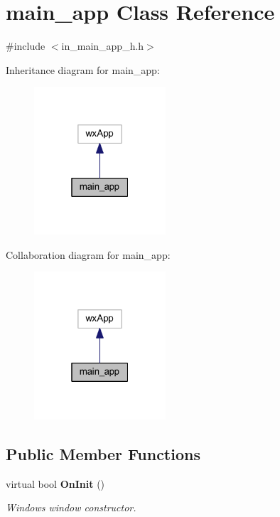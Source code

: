 \section{main\+\_\+app Class Reference}
\label{classmain__app}


{\ttfamily \#include $<$in\+\_\+main\+\_\+app\+\_\+h.\+h$>$}



Inheritance diagram for main\+\_\+app\+:\nopagebreak
\begin{figure}[H]
\begin{center}
\leavevmode
\includegraphics[width=139pt]{classmain__app__inherit__graph}
\end{center}
\end{figure}


Collaboration diagram for main\+\_\+app\+:\nopagebreak
\begin{figure}[H]
\begin{center}
\leavevmode
\includegraphics[width=139pt]{classmain__app__coll__graph}
\end{center}
\end{figure}
\subsection*{Public Member Functions}
\begin{DoxyCompactItemize}
\item 
virtual bool \textbf{ On\+Init} ()
\begin{DoxyCompactList}\small\item\em Windows window constructor. \end{DoxyCompactList}\end{DoxyCompactItemize}


